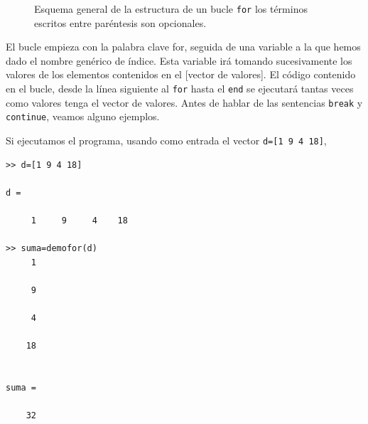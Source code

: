 \begin{figure}[h]
\centering
{}
\caption{Esquema general de la estructura de un bucle \texttt{for} los términos escritos entre paréntesis son opcionales.}
\label{fig:for}
\end{figure} 
 
El bucle empieza con la palabra clave for, seguida de una variable a la que hemos dado el nombre genérico de índice. Esta variable irá tomando sucesivamente los valores de los elementos contenidos en el [vector de valores]. El código contenido en el bucle, desde la línea siguiente al \texttt{for} hasta el \texttt{end} se ejecutará tantas veces como valores tenga el vector de valores. Antes de hablar de las sentencias \texttt{break} y \texttt{continue}, veamos alguno ejemplos.



Si ejecutamos el programa, usando como entrada el vector \texttt{d=[1 9 4 18]},

\begin{verbatim}
>> d=[1 9 4 18]

d =

     1     9     4    18

>> suma=demofor(d)
     1

     9

     4

    18


suma =

    32
\end{verbatim}


